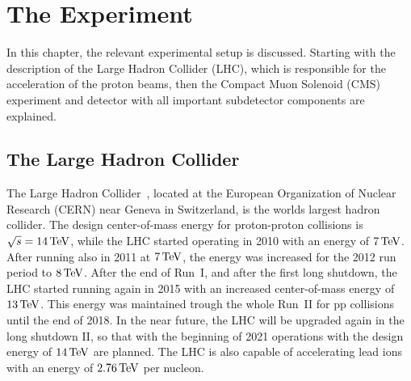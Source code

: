 \chapter{The Experiment}\label{chap:experiment}
\minitoc
In this chapter, the relevant experimental setup is discussed. Starting with the description of the Large Hadron Collider (LHC), which is responsible for the acceleration of the proton beams, then the Compact Muon Solenoid (CMS) experiment and detector with all important subdetector components are explained.
\section{The Large Hadron Collider}\label{sec:LHC}
The Large Hadron Collider~\cite{LHC1,LHC2}, located at the European Organization of Nuclear Research (CERN) near Geneva in Switzerland, is the worlds largest hadron collider. The design center-of-mass energy for proton-proton collisions is $\sqrt{s}=14\,\text{Te\hspace{-.08em}V}$, while the LHC started operating in 2010 with an energy of $7\,\text{Te\hspace{-.08em}V}$. After running also in 2011 at $7\,\text{Te\hspace{-.08em}V}$, the energy was increased for the 2012 run period to $8\,\text{Te\hspace{-.08em}V}$. After the end of Run~I, and after the first long shutdown, the LHC started running again in 2015 with an increased center-of-mass energy of $13\,\text{Te\hspace{-.08em}V}$. This energy was maintained trough the whole Run~II for pp collisions until the end of 2018. In the near future, the LHC will be upgraded again in the long shutdown II, so that with the beginning of 2021 operations with the design energy of $14\,\text{Te\hspace{-.08em}V}$ are planned.
The LHC is also capable of accelerating lead ions with an energy of $2.76\,\text{Te\hspace{-.08em}V}$ per nucleon.\\
